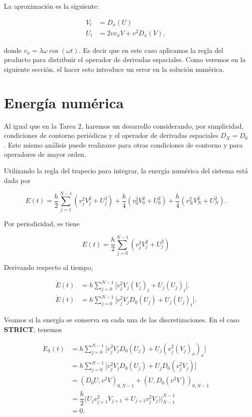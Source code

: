 \documentclass[12pt]{article}
\begin{document}
La aproximaci\'on es la siguiente:

\begin{align}
V_t &= D_x(U) \\
U_t &= 2 v v_x V + v^2 D_x(V),
\end{align}

donde $v_x = \lambda \omega \cos(\omega t)$. Es decir que en este caso aplicamos la regla del producto para distribuir el operador de derivadas espaciales. Como veremos en la siguiente secci\'on, el hacer esto introduce un error en la soluci\'on num\'erica.

\section{Energ\'ia num\'erica}

Al igual que en la Tarea 2, haremos un desarrollo considerando, por simplicidad, condiciones de contorno peri\'odicas y el operador de derivadas espaciales $D_X = D_0$. Este mismo an\'alisis puede realizarse para otras condiciones de contorno y para operadores de mayor orden.

Utilizando la regla del trapecio para integrar, la energ\'ia num\'erica del sistema est\'a dada por 

\begin{equation}
E(t) = \dfrac{h}{2}\sum_{j=1}^{N-1} (v_j^2 V_j^2 + U_j^2) + \dfrac{h}{4} (v_0^2 V_0^2 + U_0^2) + \dfrac{h}{4} (v_N^2 V_N^2 + U_N^2). 
\end{equation}

Por periodicidad, se tiene

\begin{equation}
E(t) = \dfrac{h}{2}\sum_{j=0}^{N-1} (v_j^2 V_j^2 + U_j^2) 
\end{equation}

Derivando respecto al tiempo,

\begin{align}
\dot{E}(t) &= h \sum_{j=0}^{N-1} \bigg[v_j^2 V_j (V_j)_t + U_j (U_j)_t\bigg]. \nonumber \\
\dot{E}(t) &= h \sum_{j=0}^{N-1} \bigg[v_j^2 V_j D_0(U_j) + U_j (U_j)_t\bigg]. 
\end{align}

Veamos si la energ\'ia se conserva en cada una de las discretizaciones. En el caso \textbf{STRICT}, tenemos


\begin{align}
\dot{E}_{\mathrm{S}}(t) &= h \sum_{j=0}^{N-1} \bigg[v_j^2 V_j D_0(U_j) + U_j (v_j^2 (V_j)_x)_x\bigg] \nonumber \\
 &= h \sum_{j=0}^{N-1} \bigg[v_j^2 V_j D_0(U_j) + U_j D_0(v_j^2V_j)\bigg] \nonumber \\
&= (D_0 U, v^2V)_{0, N-1} + (U, D_0(v^2 V))_{0, N-1} \nonumber\\
&= \dfrac{h}{2} \bigg(U_j v_{j+1}^2V_{j+1} + U_{j+1}v_j^2 V_j \bigg) \bigg|_{N-1}^{N - 1} \nonumber \\
&= 0.
\end{align}
\end{document}
